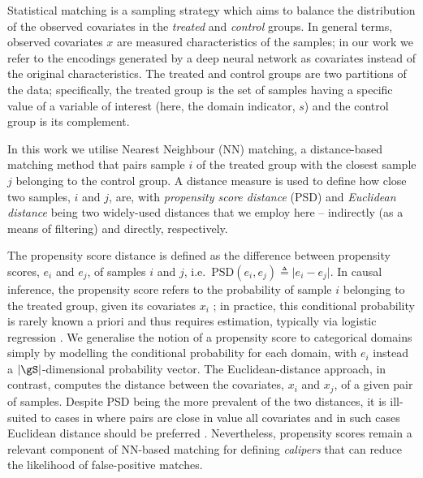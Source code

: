 Statistical matching is a sampling strategy which aims to balance the distribution of the observed
covariates in the \emph{treated} and \emph{control} groups. In general terms, observed covariates
$x$ are measured characteristics of the samples; in our work we refer to the encodings generated by
a deep neural network as covariates instead of the original characteristics. 
%
The treated and control groups are two partitions of the data; specifically, the treated group is
the set of samples having a specific value of a variable of interest (here, the domain indicator,
$s$) and the control group is its complement.

In this work we utilise Nearest Neighbour (NN) matching, a distance-based matching method that pairs
sample $i$ of the treated group with the closest sample $j$ belonging to the control group.
%
A distance measure is used to define how close two samples, $i$ and $j$, are, with \emph{propensity
score distance} (PSD) and \emph{Euclidean distance} being two widely-used distances that we employ
here
-- indirectly (as a means of filtering) and directly, respectively.

The propensity score distance is defined as the difference between propensity scores, $e_i$ and
$e_j$, of samples $i$ and $j$, i.e.\ \( \mathrm{PSD}(e_i, e_j) \triangleq \vert e_i - e_j \vert \). 
%
In causal inference, the propensity score refers to the probability of sample $i$ belonging to the
treated group, given its covariates $x_i$ \citep{rosenbaum1983central}; in practice, this
conditional probability is rarely known a priori and thus requires estimation, typically via
logistic regression \citep{stuart2010matching}. 
%
We generalise the notion of a propensity score to categorical domains simply by modelling the
conditional probability for each domain, with  $e_i$ instead a \( |\gS| \)-dimensional probability
vector.
%
The Euclidean-distance approach, in contrast, computes the distance between the covariates,
$x_i$ and $x_j$, of a given pair of samples.
%
Despite PSD being the more prevalent of the two distances, it is ill-suited to cases in where pairs
are close in value \wrt{} all covariates and in such cases Euclidean distance should be preferred
\citep{king2019propensity}. 
%
Nevertheless, propensity scores remain a relevant component of NN-based matching for defining
\emph{calipers} that can reduce the likelihood of false-positive matches.
%

